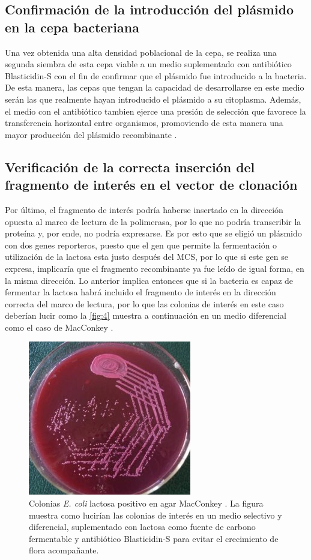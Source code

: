 \documentclass[12pt]{article}
\begin{document}
		\subsection{Confirmación de la introducción del plásmido en la cepa bacteriana}
		Una vez obtenida una alta densidad poblacional de la cepa, se realiza una segunda siembra de esta cepa viable a un medio suplementado con antibiótico Blasticidin-S con el fin de confirmar que el plásmido fue introducido a la bacteria. De esta manera, las cepas que tengan la capacidad de desarrollarse en este medio serán las que realmente hayan introducido el plásmido a su citoplasma. Además, el medio con el antibiótico tambien ejerce una presión de selección que favorece la transferencia horizontal entre organismos, promoviendo de esta manera una mayor producción del plásmido recombinante \cite{marraffini2008crispr}.
	
	\subsection{Verificación de la correcta inserción del fragmento de interés en el vector de clonación}
		Por último, el fragmento de interés podría haberse insertado en la dirección opuesta al marco de lectura de la polimerasa, por lo que no podría transcribir la proteína y, por ende, no podría expresarse. Es por esto que se eligió un plásmido con dos genes reporteros, puesto que el gen que permite la fermentación o utilización de la lactosa esta justo despu\'es del MCS, por lo que si este gen se expresa, implicaría que el fragmento recombinante ya fue leído de igual forma, en la misma dirección. Lo anterior implica entonces que si la bacteria es capaz de fermentar la lactosa habrá incluido el fragmento de interés en la dirección correcta del marco de lectura, por lo que las colonias de interés en este caso deberían lucir como la \autoref{fig:4} muestra a continuación en un medio diferencial como el caso de MacConkey \cite{harvey2007microbiology}.
		
		\begin{figure}[h]
			\centering
			\includegraphics[width=0.4\linewidth]{mc}
			\caption{Colonias \textit{E. coli} lactosa positivo en agar MacConkey \cite{MacConkey}. La figura muestra como lucirían las colonias de interés en un medio selectivo y diferencial, suplementado con lactosa como fuente de carbono fermentable y antibiótico Blasticidin-S para evitar el crecimiento de flora acompañante.}
			\label{fig:4}
		\end{figure}
\end{document}
